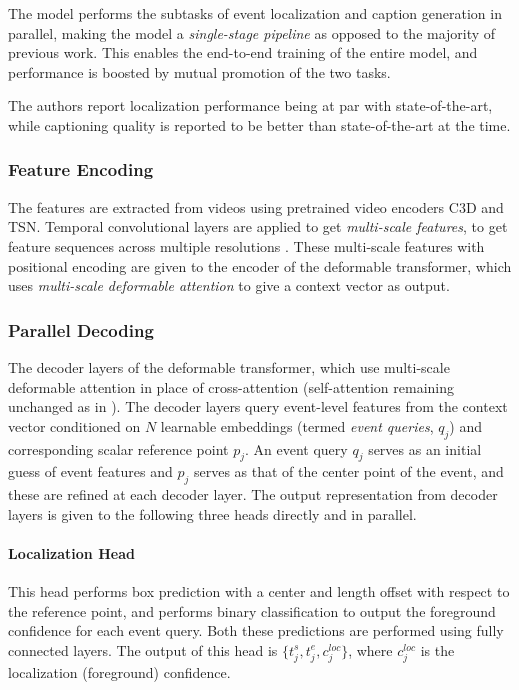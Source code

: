 \par The model performs the subtasks of event localization and caption generation in parallel, making the model a \textit{single-stage pipeline} as opposed to the majority of previous work. This enables the end-to-end training of the entire model, and performance is boosted by mutual promotion of the two tasks.

\par The authors report localization performance being at par with state-of-the-art, while captioning quality is reported to be better than state-of-the-art at the time.


\subsubsection{Feature Encoding}
The features are extracted from videos using pretrained video encoders C3D and TSN. Temporal convolutional layers are applied to get \textit{multi-scale features}, to get feature sequences across multiple resolutions \cite{wang2021endtoend}. These multi-scale features with positional encoding are given to the encoder of the deformable transformer, which uses \textit{multi-scale deformable attention} to give a context vector as output.

\subsubsection{Parallel Decoding}
\par The decoder layers of the deformable transformer, which use multi-scale deformable attention in place of cross-attention (self-attention remaining unchanged as in \cite{tfm}). The decoder layers query event-level features from the context vector conditioned on $N$ learnable embeddings (termed \textit{event queries}, $q_j$) and corresponding scalar reference point $p_j$. An event query $q_j$ serves as an initial guess of event features and $p_j$ serves as that of the center point of the event, and these are refined at each decoder layer. The output representation from decoder layers is given to the following three heads directly and in parallel.

\paragraph{Localization Head} This head performs box prediction with a center and length offset with respect to the reference point, and performs binary classification to output the foreground confidence for each event query. Both these predictions are performed using fully connected layers. The output of this head is $\{ t_j^s, t_j^e, c_j^{loc} \}$, where $c_j^{loc}$ is the localization (foreground) confidence.

